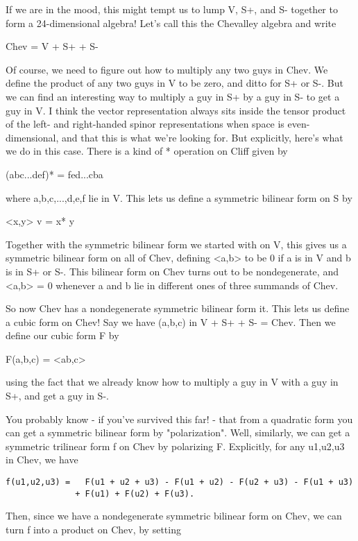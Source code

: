 If we are in the mood, this might tempt us to lump V, S+, and S- together to
form a 24-dimensional algebra!  Let's call this the Chevalley algebra
and write 

Chev = V + S+ + S-

Of course, we need to figure out how to multiply any two guys in Chev.
We define the product of any two guys in V to be zero, and ditto for
S+ or S-.  But we can find an interesting way to multiply a guy in S+
by a guy in S- to get a guy in V.  I think the vector representation
always sits inside the tensor product of the left- and right-handed
spinor representations when space is even-dimensional, and that
this is what we're looking for.  But explicitly, here's what we do 
in this case.  There is a kind of * operation on Cliff given 
by 

(abc...def)* = fed...cba

where a,b,c,...,d,e,f lie in V.  This lets us define a symmetric
bilinear form on S by

<x,y> v = x* y

Together with the symmetric bilinear form we started with on V,
this gives us a symmetric bilinear form on all of Chev, defining
<a,b> to be 0 if a is in V and b is in S+ or S-.  This bilinear form
on Chev turns out to be nondegenerate, and <a,b> = 0 whenever a and
b lie in different ones of three summands of Chev.  

So now Chev has a nondegenerate symmetric bilinear form it.  This lets
us define a cubic form on Chev!  Say we have (a,b,c) in V + S+ + S- =
Chev.  Then we define our cubic form F by

F(a,b,c) = <ab,c>

using the fact that we already know how to multiply a guy in V with
a guy in S+, and get a guy in S-.  

You probably know - if you've survived this far! - that from a 
quadratic form you can get a symmetric bilinear form by "polarization".  
Well, similarly, we can get a symmetric trilinear form f on Chev by
polarizing F.  Explicitly, for any u1,u2,u3 in Chev, we have

\begin{verbatim}
f(u1,u2,u3) =   F(u1 + u2 + u3) - F(u1 + u2) - F(u2 + u3) - F(u1 + u3)
              + F(u1) + F(u2) + F(u3).
\end{verbatim}
    

Then, since we have a nondegenerate symmetric bilinear form on Chev, we
can turn f into a product on Chev, by setting

